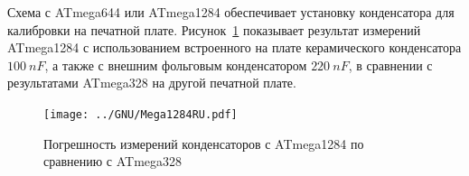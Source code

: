 Схема с ATmega644 или ATmega1284 обеспечивает установку конденсатора для калибровки на печатной плате.
Рисунок~\ref{fig:Mega1284} показывает результат измерений ATmega1284 с использованием 
встроенного на плате керамического конденсатора \(100~nF\), а также с внешним фольговым конденсатором \(220~nF\), 
в сравнении с результатами ATmega328 на другой печатной плате.

\begin{figure}[H]
\centering
\texttt{[image: ../GNU/Mega1284RU.pdf]}
\caption{Погрешность измерений конденсаторов с ATmega1284 по сравнению с ATmega328}
\label{fig:Mega1284}
\end{figure}

